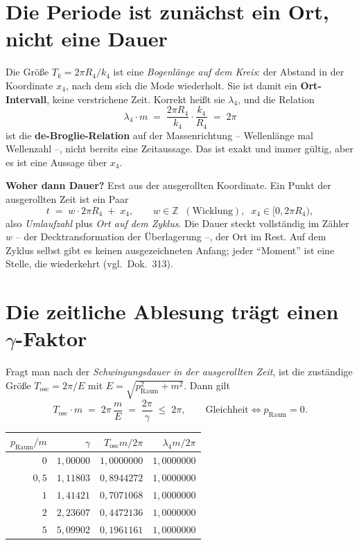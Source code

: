 \documentclass[11pt]{report}
\begin{document}
\section{Die Periode ist zunächst ein Ort, nicht eine Dauer}

Die Größe $T_k = 2\pi R_4/k_4$ ist eine \emph{Bogenlänge auf dem
Kreis}: der Abstand in der Koordinate $x_4$, nach dem sich die Mode
wiederholt. Sie ist damit ein \textbf{Ort-Intervall}, keine
verstrichene Zeit. Korrekt heißt sie $\lambda_4$, und die Relation
\begin{equation}
  \lambda_4 \cdot m \;=\; \frac{2\pi R_4}{k_4}\cdot\frac{k_4}{R_4}
  \;=\; 2\pi
\end{equation}
ist die \textbf{de-Broglie-Relation} auf der Massenrichtung --
Wellenlänge mal Wellenzahl --, nicht bereits eine Zeitaussage.
Das ist exakt und immer gültig, aber es ist eine Aussage über
$x_4$.

\textbf{Woher dann Dauer?} Erst aus der ausgerollten Koordinate.
Ein Punkt der ausgerollten Zeit ist ein Paar
\begin{equation}
  t \;=\; w\cdot 2\pi R_4 \;+\; x_4,
  \qquad w \in \mathbb{Z} \;\;(\text{Wicklung}),\;\;
  x_4 \in [0, 2\pi R_4),
\end{equation}
also \emph{Umlaufzahl} plus \emph{Ort auf dem Zyklus}. Die Dauer
steckt vollständig im Zähler $w$ -- der Decktransformation der
Überlagerung --, der Ort im Rest. Auf dem Zyklus selbst gibt es
keinen ausgezeichneten Anfang; jeder \enquote{Moment} ist eine
Stelle, die wiederkehrt (vgl.\ Dok.~313).

\section{Die zeitliche Ablesung trägt einen \texorpdfstring{$\gamma$}{gamma}-Faktor}

Fragt man nach der \emph{Schwingungsdauer in der ausgerollten
Zeit}, ist die zuständige Größe $T_\text{osc} = 2\pi/E$ mit
$E = \sqrt{p_\text{Raum}^2 + m^2}$. Dann gilt
\begin{equation}
  T_\text{osc}\cdot m \;=\; 2\pi\,\frac{m}{E}
  \;=\; \frac{2\pi}{\gamma}
  \;\le\; 2\pi,
  \qquad\text{Gleichheit} \iff p_\text{Raum} = 0 .
\end{equation}

\begin{center}
\begin{tabular}{rrrr}
\toprule
$p_\text{Raum}/m$ & $\gamma$ & $T_\text{osc}m/2\pi$ &
  $\lambda_4 m/2\pi$ \\
\midrule
$0$   & $1{,}00000$ & $1{,}0000000$ & $1{,}0000000$ \\
$0{,}5$ & $1{,}11803$ & $0{,}8944272$ & $1{,}0000000$ \\
$1$   & $1{,}41421$ & $0{,}7071068$ & $1{,}0000000$ \\
$2$   & $2{,}23607$ & $0{,}4472136$ & $1{,}0000000$ \\
$5$   & $5{,}09902$ & $0{,}1961161$ & $1{,}0000000$ \\
\bottomrule
\end{tabular}
\end{center}
\end{document}

